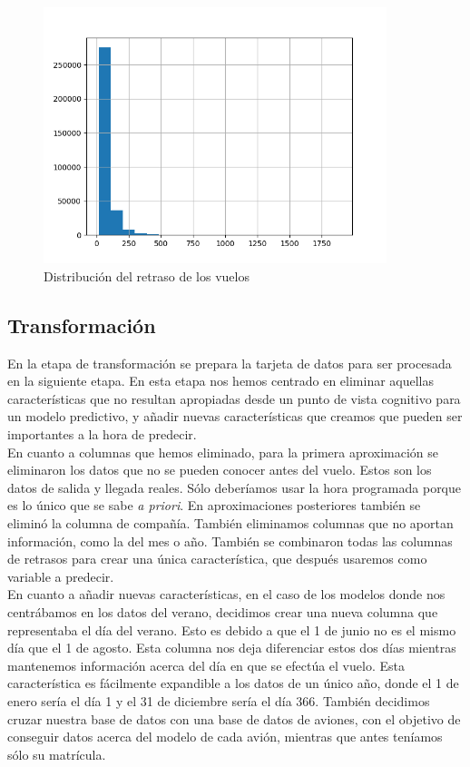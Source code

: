 \documentclass[format=acmsmall, review=false, screen=true]{acmart}
\begin{document}
\begin{figure}[htb]
	\centering
	\includegraphics[width=10cm]{delayhistogram.png}
	\caption{Distribución del retraso de los vuelos}
	\label{retrasito}
\end{figure}

\subsection{Transformación}
En la etapa de transformación se prepara la tarjeta de datos para ser procesada en la siguiente etapa. En esta etapa nos hemos centrado en eliminar aquellas características que no resultan apropiadas desde un punto de vista cognitivo para un modelo predictivo, y añadir nuevas características que creamos que pueden ser importantes a la hora de predecir. \\

En cuanto a columnas que hemos eliminado, para la primera aproximación se eliminaron los datos que no se pueden conocer antes del vuelo. Estos son los datos de salida y llegada reales. Sólo deberíamos usar la hora programada porque es lo único que se sabe \textit{a priori}. En aproximaciones posteriores también se eliminó la columna de compañía. También eliminamos columnas que no aportan información, como la del mes o año.
También se combinaron todas las columnas de retrasos para crear una única característica, que después usaremos como variable a predecir.\\

En cuanto a añadir nuevas características, en el caso de los modelos donde nos centrábamos en los datos del verano, decidimos crear una nueva columna que representaba el día del verano. Esto es debido a que el 1 de junio no es el mismo día que el 1 de agosto. Esta columna nos deja diferenciar estos dos días mientras mantenemos información acerca del día en que se efectúa el vuelo. Esta característica es fácilmente expandible a los datos de un único año, donde el 1 de enero sería el día 1 y el 31 de diciembre sería el día 366.
También decidimos cruzar nuestra base de datos con una base de datos de aviones, con el objetivo de conseguir datos acerca del modelo de cada avión, mientras que antes teníamos sólo su matrícula.\\
\end{document}
